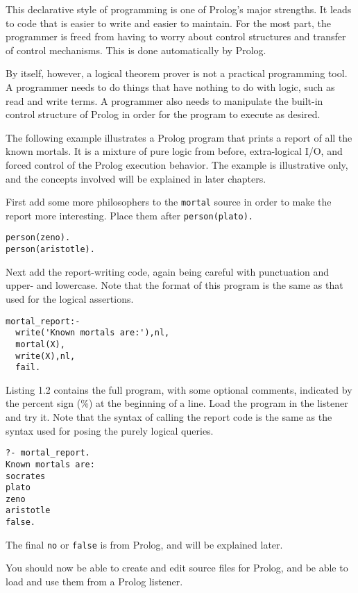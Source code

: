 This declarative style of programming is one of Prolog's major strengths. It
leads to code that is easier to write and easier to maintain. For the most part,
the programmer is freed from having to worry about control structures and
transfer of control mechanisms. This is done automatically by Prolog.

By itself, however, a logical theorem prover is not a practical programming
tool. A programmer needs to do things that have nothing to do with logic, such
as read and write terms. A programmer also needs to manipulate the built-in
control structure of Prolog in order for the program to execute as desired.

The following example illustrates a Prolog program that prints a report of all
the known mortals. It is a mixture of pure logic from before, extra-logical I/O,
and forced control of the Prolog execution behavior. The example is illustrative
only, and the concepts involved will be explained in later chapters.

First add some more philosophers to the \verb'mortal' source in order to make
the report more interesting. Place them after \verb'person(plato).'
\begin{verbatim}
person(zeno).
person(aristotle).
\end{verbatim}

Next add the report-writing code, again being careful with punctuation and
upper- and lowercase. Note that the format of this program is the same as that
used for the logical assertions.
\begin{verbatim}
mortal_report:-  
  write('Known mortals are:'),nl,
  mortal(X),
  write(X),nl,
  fail.
\end{verbatim}


Listing 1.2 contains the full program, with some optional comments, indicated by
the percent sign (\%) at the beginning of a line. Load the program in the
listener and try it. Note that the syntax of calling the report code is the same
as the syntax used for posing the purely logical queries.

\begin{verbatim}
?- mortal_report.
Known mortals are:
socrates
plato
zeno
aristotle
false.
\end{verbatim}

The final \verb'no' or \verb'false' is from Prolog, and will be explained later.

You should now be able to create and edit source files for Prolog, and be able
to load and use them from a Prolog listener.


